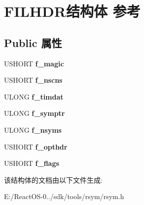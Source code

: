 \hypertarget{struct_f_i_l_h_d_r}{}\section{F\+I\+L\+H\+D\+R结构体 参考}
\label{struct_f_i_l_h_d_r}
\subsection*{Public 属性}
\begin{DoxyCompactItemize}
\item 
\mbox{\label{struct_f_i_l_h_d_r_a3bcfa0e1a875db17b306384f233b3805}} 
U\+S\+H\+O\+RT {\bfseries f\+\_\+magic}
\item 
\mbox{\label{struct_f_i_l_h_d_r_a74bc341330a271023fdec547896916ab}} 
U\+S\+H\+O\+RT {\bfseries f\+\_\+nscns}
\item 
\mbox{\label{struct_f_i_l_h_d_r_a8d336f06da8e32941ccd98ddab0ece5b}} 
U\+L\+O\+NG {\bfseries f\+\_\+timdat}
\item 
\mbox{\label{struct_f_i_l_h_d_r_ac021107a9819e73d30cbaeff4e564761}} 
U\+L\+O\+NG {\bfseries f\+\_\+symptr}
\item 
\mbox{\label{struct_f_i_l_h_d_r_a3acd29332e06ed08c57c5a8dc23d80af}} 
U\+L\+O\+NG {\bfseries f\+\_\+nsyms}
\item 
\mbox{\label{struct_f_i_l_h_d_r_a2e099590094f3cf6ce874e5e1321090d}} 
U\+S\+H\+O\+RT {\bfseries f\+\_\+opthdr}
\item 
\mbox{\label{struct_f_i_l_h_d_r_ace60664c57ce0b875f71f203bcdc58f8}} 
U\+S\+H\+O\+RT {\bfseries f\+\_\+flags}
\end{DoxyCompactItemize}


该结构体的文档由以下文件生成\+:\begin{DoxyCompactItemize}
\item 
E\+:/\+React\+O\+S-\/0../sdk/tools/rsym/rsym.\+h\end{DoxyCompactItemize}
